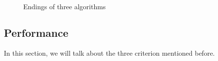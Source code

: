 \documentclass[12pt]{article}
\begin{document}
\begin{figure}[H]
    \centering

        \caption{Endings of three algorithms}
\end{figure}

\subsection{Performance}
In this section, we will talk about the three criterion mentioned before.
\end{document}
